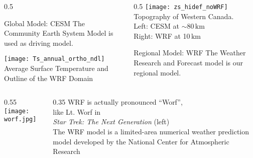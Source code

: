 \documentclass[hyperref={pdfpagelabels=false},compress,final]{beamer}
\newcommand{\km}{\ensuremath{\,\mbox{km}}}
\newenvironment{myBox}[3][shadow=true]%
{\begin{center} \begin{minipage}{#2} \begin{beamerboxesrounded}[#1]{#3} \smallskip}%
{\smallskip \end{beamerboxesrounded} \end{minipage} \end{center}}
\begin{document}
\begin{frame}{}
  \begin{columns}
    \begin{column}{0.5\textwidth}
      \small
      \begin{myBox}[shadow=true]{0.92\textwidth}{Global Model: CESM}
        \small The Community Earth System Model is used as driving model.
      \end{myBox}
      \texttt{[image: Ts\_annual\_ortho\_ndl]} \\
      {\footnotesize Average Surface Temperature and Outline of the WRF Domain}
    \end{column}
    \begin{column}{0.5\textwidth}
      \small
      \texttt{[image: zs\_hidef\_noWRF]} \\ \smallskip
      {\footnotesize Topography of Western Canada.\\
      Left: CESM at $\sim$80\km{}\\
      Right: WRF at 10\km{} }
      \begin{myBox}[shadow=true]{0.96\textwidth}{Regional Model: WRF}
        \small The Weather Research and Forecast model is our regional model.
      \end{myBox}
    \end{column}
  \end{columns}
\end{frame}

\begin{frame}
  \begin{columns}
    \begin{column}{0.55\textwidth}
      \texttt{[image: worf.jpg]}
    \end{column}
    \begin{column}{0.35\textwidth}
      {WRF is actually pronounced ``Worf'',\\ like Lt. Worf in \\\textit{Star Trek: The Next Generation} (left)}
      \\ \bigskip \medskip
      {\small The WRF model is a limited-area numerical weather prediction model developed by the National Center for Atmospheric Research}
    \end{column}
  \end{columns}
\end{frame}
\end{document}
